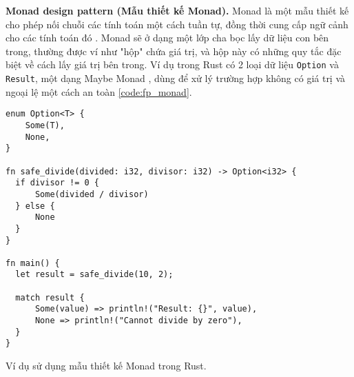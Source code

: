 
\textbf{Monad design pattern (Mẫu thiết kế Monad).} Monad là một mẫu thiết kế cho phép nối chuỗi các tính toán một cách tuần tự, đồng thời cung cấp ngữ cảnh cho các tính toán đó \cite{gill2015remote}.
Monad sẽ ở dạng một lớp cha bọc lấy dữ liệu con bên trong, thường được ví như "hộp" chứa giá trị, và hộp này có những quy tắc đặc biệt về cách lấy giá trị bên trong.
Ví dụ trong Rust có 2 loại dữ liệu \texttt{Option} và \texttt{Result}, một dạng Maybe Monad \cite{wikibooksHaskellUnderstandingMonadsMaybe}, dùng để xử lý trường hợp không có giá trị và ngoại lệ một cách an toàn \ref{code:fp_monad}.

\begin{listing}[H]
\begin{verbatim}
enum Option<T> {
    Some(T),
    None,
}

fn safe_divide(divided: i32, divisor: i32) -> Option<i32> {
  if divisor != 0 {
      Some(divided / divisor)
  } else {
      None
  }
}

fn main() {
  let result = safe_divide(10, 2);

  match result {
      Some(value) => println!("Result: {}", value),
      None => println!("Cannot divide by zero"),
  }
}
\end{verbatim}
\caption{Ví dụ sử dụng mẫu thiết kế Monad trong Rust.}
\label{code:fp_monad}
\end{listing}



